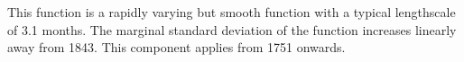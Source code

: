 This function is a rapidly varying but smooth function with a typical lengthscale of 3.1 months.
The marginal standard deviation of the function increases linearly away from 1843.
This component applies from 1751 onwards.